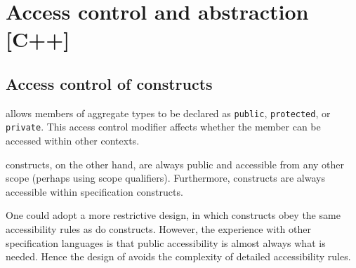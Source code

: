 \section{Access control and abstraction [C++]}
\label{sec:access}


\subsection{Access control of \NAME{} constructs}

\lang{} allows members of aggregate types to be declared as \lstinline|public|, \lstinline|protected|, or \lstinline|private|. This access control modifier affects whether the member can be accessed within other contexts. 

\NAME{} constructs, on the other hand, are always public and accessible from any other scope (perhaps using scope qualifiers). 
Furthermore, \lang{} constructs are always accessible within \NAME{}
specification constructs.

One could adopt a more restrictive design, in which \NAME{} constructs
obey the same accessibility rules as do \lang{} constructs. 
However, the experience with other specification languages is that 
public accessibility is almost always what is needed. Hence the design
of \NAME{} avoids the complexity of detailed accessibility rules.

%

